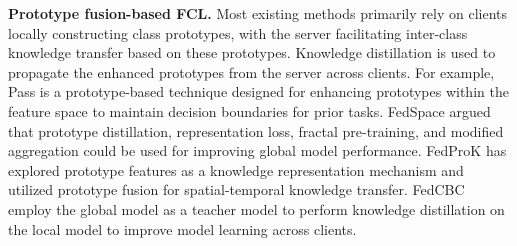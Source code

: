 \noindent\textbf{Prototype fusion-based FCL.}
Most existing methods primarily rely on clients locally constructing class prototypes, with the server facilitating inter-class knowledge transfer based on these prototypes. 
Knowledge distillation \cite{ma2022continual} is used to propagate the enhanced prototypes from the server across clients.
For example, Pass \cite{zhu2021prototype} is a prototype-based technique designed for enhancing prototypes within the feature space to maintain decision boundaries for prior tasks. 
FedSpace \cite{shenaj2023asynchronous} argued that prototype distillation, representation loss, fractal pre-training, and modified aggregation could be used for improving global model performance. 
FedProK \cite{gao2024fedprok} has explored prototype features as a knowledge representation mechanism and utilized prototype fusion for spatial-temporal knowledge transfer.
FedCBC \cite{yu2024overcoming} employ the global model as a teacher model to perform knowledge distillation on the local model to improve model learning across clients.

